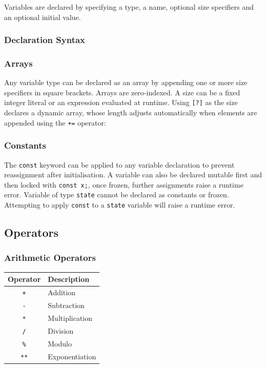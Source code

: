 Variables are declared by specifying a type, a name, optional size specifiers
 and an optional initial value.

\subsubsection{Declaration Syntax}



\subsubsection{Arrays}

Any variable type can be declared as an array by appending one or more size
specifiers in square brackets. Arrays are zero-indexed. A size can be a fixed
integer literal or an expression evaluated at runtime. Using \texttt{[?]} as
the size declares a dynamic array, whose length adjusts automatically
when elements are appended using the \texttt{+=} operator:



\subsubsection{Constants}

The \texttt{const} keyword can be applied to any variable declaration to
prevent reassignment after initialisation. A variable can also be declared mutable
first and then locked with \texttt{const x;}, once frozen, further
assignments raise a runtime error. Variable of type \texttt{state}
cannot be declared as constants or frozen. Attempting to apply \texttt{const}
to a \texttt{state} variable will raise a runtime error.



\subsection{Operators}\label{sec:operators}

\subsubsection{Arithmetic Operators}

\begin{center}
\begin{tabular}{|c|l|}
\hline
\textbf{Operator} & \textbf{Description} \\
\hline
\texttt{+}  & Addition \\
\texttt{-}  & Subtraction \\
\texttt{*}  & Multiplication \\
\texttt{/}  & Division \\
\texttt{\%} & Modulo \\
\texttt{**} & Exponentiation \\
\hline
\end{tabular}
\end{center}

